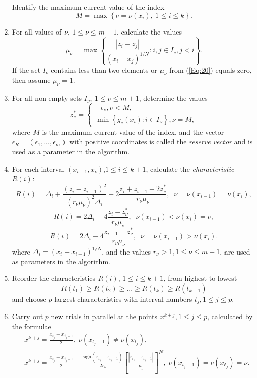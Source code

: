 \documentclass{llncs}
\begin{document}
\begin{enumerate}
Identify the maximum current value of the index
\begin{equation}\label{Eq:19}
M=\max \left\{\nu = \nu(x_i), \ 1\leq i \leq k\right\}.
\end{equation}
\item
For all values of $\nu, \ 1\leq \nu \leq m+1$, calculate the values  
\begin{equation}\label{Eq:20}
\mu_\nu = \max \left\{ \frac{\left|z_i-z_j\right|}{\left(x_i-x_j\right)^{1/N}} : i,j \in I_\nu, 
j<i\right\}.
\end{equation}
If the set $I_\nu$ contains less than two elements or $\mu_\nu$ from (\ref{Eq:20}) equals zero, 
then assume $\mu_\nu=1$.
\item
For all non-empty sets $I_\nu$, $1 \leq \nu \leq m+1$, determine the values
\begin{equation}\label{Eq:21}
  z^\ast_\nu =  
   \begin{cases}
    -\epsilon_\nu,  \nu < M, \\
    \min{\left\{g_\nu(x_i):i\in I_\nu\right\}}, \nu = M,
   \end{cases}
\end{equation}
where $M$ is the maximum current value of the index, and the vector $\epsilon _R=\left(\epsilon_1,...,\epsilon_m\right)$ with positive coordinates is called the \textit{reserve vector} and is used as a parameter in the 
algorithm.
\item
For each interval $(x_{i-1},x_i)$,$1 \leq i \leq k+1$, calculate the \textit{characteristic} $R(i)$: 
\[
R(i)=\Delta_i+ \frac{(z_i-z_{i-1})^2}{(r_\nu\mu_\nu)^2\Delta_i}-2\frac{z_i+z_{i-1}-
2z^\ast_\nu}{r_\nu\mu_\nu},\;\; \nu=\nu(x_{i-1})=\nu(x_i),
\]
\[
R(i)= 2\Delta_i-4\frac{z_i-z^\ast_\nu}{r_\nu\mu_\nu},\;\; \nu(x_{i-1})<\nu(x_i)=\nu,
\]
\[
R(i)= 2\Delta_i-4\frac{z_{i-1}-z^\ast_\nu}{r_\nu\mu_\nu},\;\; \nu = \nu(x_{i-1})>\nu(x_i).
\]
where $\Delta_i=(x_i-x_{i-1})^{1/N}$, and the values $r_\nu>1, 1\leq\nu\leq m+1$, are used as 
parameters in the algorithm.
\item
Reorder the characteristics $R(i)$, $1\leq i \leq k+1$, from highest to lowest 	
\begin{equation}\label{Eq:23}
R(t_1)\geq R(t_2)\geq ... \geq R(t_{k})\geq R(t_{k+1})
\end{equation}
and choose $p$ largest characteristics with interval numbers $t_j, 1\leq j \leq p$.
\item
Carry out $p$ new trials in parallel at the points $x^{k+j}, 1 \leq j \leq p$, calculated by the 
formulae
\begin{eqnarray*}
& x^{k+j}=\frac{x_{t_j}+x_{t_j-1}}{2}, \; \nu(x_{t_j-1})\neq \nu(x_{t_j}), \\
& x^{k+j}=\frac{x_{t_j}+x_{t_j-1}}{2}- \frac{\mathrm{sign}(z_{t_j}-z_{t_j-
1})}{2r_\nu}\left[\frac{\left|z_{t_j}-z_{t_j-1}\right|}{\mu_\nu}\right]^N, \; \nu(x_{t_j-
1})=\nu(x_{t_j})=\nu. \\
\end{eqnarray*} 

\end{enumerate}
\end{document}
